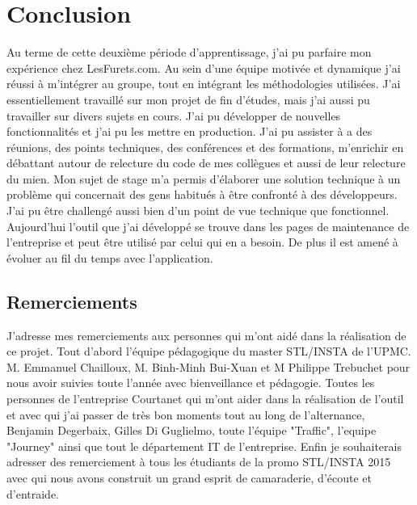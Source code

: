 \chapter{Conclusion}

Au terme de cette deuxième période d'apprentissage, j'ai pu parfaire mon expérience chez LesFurets.com. Au sein d'une équipe motivée et dynamique j'ai réussi à m'intégrer au groupe, tout en intégrant les méthodologies utilisées. J'ai essentiellement travaillé sur mon projet de fin d'études, mais j'ai aussi pu travailler sur divers sujets en cours. J'ai pu développer de nouvelles fonctionnalités  et j'ai pu les mettre en production. J'ai pu assister à a des réunions, des points techniques, des conférences et des formations, m'enrichir en débattant autour de relecture du code de mes collègues et aussi de leur relecture du mien. Mon sujet de stage m'a permis d'élaborer une solution technique à un problème qui concernait des gens habitués à être confronté à des développeurs. J'ai pu être challengé aussi bien d'un point de vue technique que fonctionnel. Aujourd'hui l'outil que j'ai développé se trouve dans les pages de maintenance de l'entreprise et peut être utilisé par celui qui en a besoin. De plus il est amené à évoluer au fil du temps avec l'application.

\section*{Remerciements}
{}
J'adresse mes remerciements aux personnes qui m'ont aidé dans la réalisation de ce projet.
Tout d'abord l'équipe pédagogique du master STL/INSTA de l'UPMC. M. Emmanuel Chailloux, M. Binh-Minh Bui-Xuan et M Philippe Trebuchet pour nous avoir suivies toute l'année avec bienveillance et pédagogie.
Toutes les personnes de l'entreprise Courtanet qui m'ont aider dans la réalisation de l'outil et avec qui j'ai passer de très bon moments tout au long de l'alternance, Benjamin Degerbaix, Gilles Di Guglielmo, toute l'équipe "Traffic", l'equipe "Journey" ainsi que tout le département IT de l'entreprise.
Enfin je souhaiterais adresser des remerciement à tous les étudiants de la promo STL/INSTA 2015 avec qui nous avons construit un grand esprit de camaraderie, d'écoute et d'entraide.